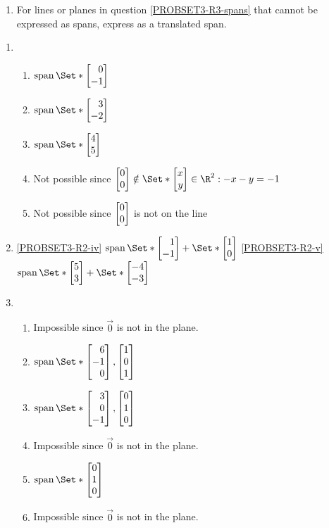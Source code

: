 \begin{exercises}
\begin{problist}
\begin{enumerate}
			\item For lines or planes in question \ref{PROBSET3-R3-spans} that cannot
			be expressed as spans, express as a translated
			span.
		\end{enumerate}
		\begin{solution}
			\begin{enumerate}
				\item
				\begin{enumerate}
					\item $\Span\Set*{\mat{0\\-1}}$
					\item $\Span\Set*{\mat{3\\-2}}$
					\item $\Span\Set*{\mat{4\\5}}$
					\item Not possible since $\mat{0\\0}\notin \Set*{\mat{x\\y}\in \R^2: -x-y=-1}$
					\item Not possible since $\mat{0\\0}$ is not on the line
				\end{enumerate}
				\item
				\ref{PROBSET3-R2-iv} $\Span\Set*{\mat{1\\-1}} + \Set*{\mat{1\\0}}$
				\ref{PROBSET3-R2-v} $\Span\Set*{\mat{5\\3}} + \Set*{\mat{-4\\-3}}$
				\item 
				\begin{enumerate}
					\item Impossible since $\vec 0$ is not in the plane.
					\item $\Span\Set*{\mat{6\\-1\\0}, \mat{1\\0\\1}}$
					\item $\Span\Set*{\mat{3\\0\\-1}, \mat{0\\1\\0}}$
					\item Impossible since $\vec 0$ is not in the plane.
					\item $\Span\Set*{\mat{0\\1\\0}}$
					\item Impossible since $\vec 0$ is not in the plane.

\end{enumerate}
\end{enumerate}
\end{solution}
\end{problist}
\end{exercises}
